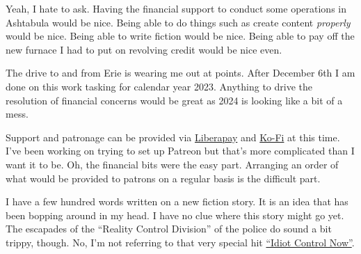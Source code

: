 Yeah, I hate to ask. Having the financial support to conduct some
operations in Ashtabula would be nice. Being able to do things such as
create content \emph{properly} would be nice. Being able to write
fiction would be nice. Being able to pay off the new furnace I had to
put on revolving credit would be nice even.

The drive to and from Erie is wearing me out at points. After December
6th I am done on this work tasking for calendar year 2023. Anything to
drive the resolution of financial concerns would be great as 2024 is
looking like a bit of a mess.

Support and patronage can be provided via
\href{https://liberapay.com/smkellat}{Liberapay} and
\href{https://ko-fi.com/smkellat}{Ko-Fi} at this time. I've been working
on trying to set up Patreon but that's more complicated than I want it
to be. Oh, the financial bits were the easy part. Arranging an order of
what would be provided to patrons on a regular basis is the difficult
part.

I have a few hundred words written on a new fiction story. It is an idea
that has been bopping around in my head. I have no clue where this story
might go yet. The escapades of the ``Reality Control Division'' of the
police do sound a bit trippy, though. No, I'm not referring to that very
special hit \href{https://mst3k.fandom.com/wiki/Idiot_Control}{``Idiot
Control Now''}.
